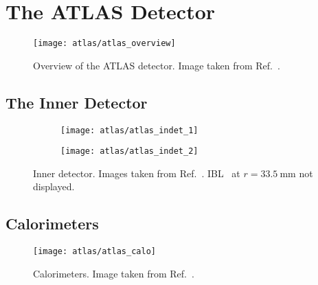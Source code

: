 \section{The ATLAS Detector}%
\label{sec:atlas}

\cite{PERF-2007-01}

\begin{figure}[htbp]
  \centering

  \texttt{[image: atlas/atlas\_overview]}

  \caption{Overview of the ATLAS detector. Image taken from
    Ref.~\cite{Pequenao:1095924}.}%
  \label{fig:atlas_detector_overview}
\end{figure}



\subsection{The Inner Detector}

\begin{figure}[htbp]

  \begin{subfigure}[b]{0.55\textwidth}
    \texttt{[image: atlas/atlas\_indet\_1]}%
    \subcaption{}
  \end{subfigure}\hfill%
  \begin{subfigure}[b]{0.45\textwidth}
    \texttt{[image: atlas/atlas\_indet\_2]}%
    \subcaption{}

  \end{subfigure}

  \caption{Inner detector. Images taken from
    Ref.~\cite{Pequenao:1095926}. IBL~\cite{PIX-2018-001} at
    $r = \SI{33.5}{\milli\metre}$ not displayed.}
  \label{fig:atlas_inner_detector}
\end{figure}


\subsection{Calorimeters}

\begin{figure}[htbp]
  \centering

  \texttt{[image: atlas/atlas\_calo]}

  \caption{Calorimeters. Image taken from Ref.~\cite{Pequenao:1095927}.}%
  \label{fig:atlas_calorimeters}
\end{figure}


